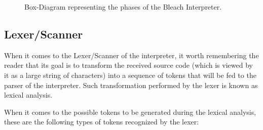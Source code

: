 \begin{figure}[h!]
  \centering
  \caption{Box-Diagram representing the phases of the Bleach Interpreter.}
\end{figure}


\subsection{Lexer/Scanner}
When it comes to the Lexer/Scanner of the interpreter, it worth remembering the reader that its goal is to transform the received source code (which is viewed by it as a large string of characters) into a sequence of tokens that will be fed to the parser of the interpreter. Such transformation performed by the lexer is known as lexical analysis.

When it comes to the possible tokens to be generated during the lexical analysis, these are the following types of tokens recognized by the lexer:

